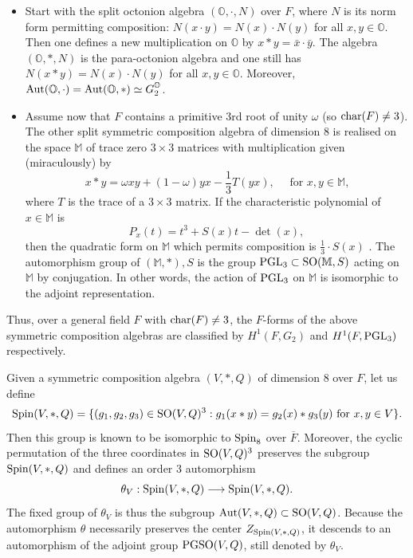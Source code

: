 \documentclass[11pt]{amsart}
\theoremstyle{plain}
\numberwithin{equation}{section}
\def\Aut{{\rm Aut}}
\def\PGSO{{\rm PGSO}}
\def\Spin{{\rm Spin}}
\def\Spin{{\rm Spin}}
\def\PGL{{\rm PGL}}
\def\SO{{\rm SO}}
\begin{document}
 \begin{itemize}
 \item  Start with the split octonion algebra $(\mathbb{O}, \cdot, N)$ over $F$, where $N$ is its norm form permitting composition: $N(x \cdot y) = N(x) \cdot N(y)$ for all $x,y \in \mathbb{O}$.
 Then one  defines a new multiplication on $\mathbb{O}$  by $x \ast y = \bar{x} \cdot \bar{y}$. The algebra $(\mathbb{O}, \ast, N)$ is  the para-octonion algebra and one still has $N( x\ast y) = N(x) \cdot N(y)$ for all $x,y \in \mathbb{O}$.  Moreover,  $\Aut(\mathbb{O}, \cdot) = \Aut(\mathbb{O}, \ast) \simeq G_2^{\mathbb{O}}$. 
 \vskip 5pt
 
 
\item Assume now that  $F$  contains a primitive 3rd root of unity $\omega$ (so ${\rm char}(F) \ne 3$).
The other split symmetric composition algebra of dimension $8$ is realised on the space $\mathbb{M}$ of trace zero $3 \times 3$ matrices with multiplication given (miraculously) by \cite[Pg. 472, (34.18)]{KMRT}
\[   x \ast y = \omega xy + (1-\omega)yx  - \frac{1}{3} T(yx), \quad \text{  for $x,y \in \mathbb{M}$,}  \]
where $T$ is the trace of a $3 \times 3$ matrix. If the characteristic polynomial of  $x \in \mathbb{M}$ is
\[ P_x(t) =  t^3  + S(x) t  - \det(x),   \]
then the quadratic form on $\mathbb{M}$ which permits composition is  $\frac{1}{3} \cdot S(x)$ \cite[Prop. 34.19]{KMRT}. The automorphism group  of $(\mathbb{M}, \ast), S$ is the group $\PGL_3 \subset \SO(\mathbb{M}, S)$ acting on $\mathbb{M}$ by conjugation. In other words, the action of $\PGL_3$ on $\mathbb{M}$ is isomorphic to the adjoint representation. 
 \end{itemize}
 Thus, over a general field $F$ with  ${\rm char}(F) \ne 3$, the $F$-forms of the above  symmetric composition algebras are classified by $H^1(F, G_2)$ and 
 $H^1(F, \PGL_3)$ respectively. 
 
 
\vskip 5pt
Given   a symmetric composition algebra $(V, \ast, Q)$  of dimension $8$ over $F$, let us define
\[  \Spin(V,\ast, Q) = \{ (g_1, g_2, g_3) \in \SO(V,Q)^3:  g_1(x \ast y) = g_2(x) \ast g_3(y) \text{ for $x,y \in V$} \}. \]
Then this group is known to be isomorphic to $\Spin_8$ over $\overline{F}$. 
Moreover, the cyclic permutation of the three coordinates in $\SO(V,Q)^3$ preserves the subgroup  $\Spin(V, \ast, Q)$ and defines an order $3$ automorphism 
\[  \theta_V:  \Spin(V, \ast, Q) \longrightarrow \Spin(V, \ast, Q). \]
The fixed group of $\theta_V$ is thus the subgroup $\Aut(V,\ast, Q) \subset \SO(V,Q)$.  
Because the automorphism $\theta$ necessarily preserves the center $Z_{\Spin(V,\ast, Q)}$, it descends to an automorphism of the adjoint group $\PGSO(V,Q)$, still denoted by $\theta_V$.
 \vskip 5pt
 
\end{document}
